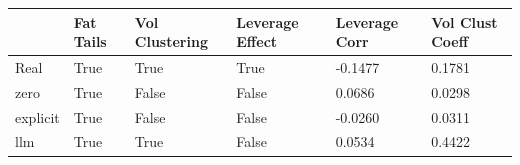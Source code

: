 \begin{tabular}{llllll}
\toprule
 & Fat Tails & Vol Clustering & Leverage Effect & Leverage Corr & Vol Clust Coeff \\
\midrule
Real & True & True & True & -0.1477 & 0.1781 \\
zero & True & False & False & 0.0686 & 0.0298 \\
explicit & True & False & False & -0.0260 & 0.0311 \\
llm & True & True & False & 0.0534 & 0.4422 \\
\bottomrule
\end{tabular}

